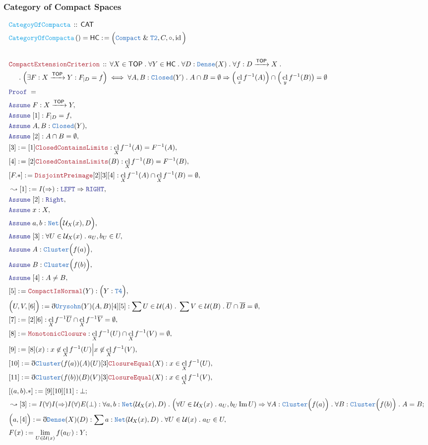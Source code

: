\documentclass[12pt]{scrartcl}
\newcommand{\TYPE}[1]{\textcolor{NavyBlue}{\mathtt{#1}}}
\newcommand{\FUNC}[1]{\textcolor{Cerulean}{\mathtt{#1}}}
\newcommand{\LOGIC}[1]{\textcolor{Blue}{\mathtt{#1}}}
\newcommand{\THM}[1]{\textcolor{Maroon}{\mathtt{#1}}}
\renewcommand{\.}{\; . \;}
\newcommand{\de}{: \kern 0.1pc =}
\newcommand{\Act}[1]{\left( #1 \right)}
\newcommand{\Theorem}[2]{& \THM{#1} \, :: \, #2 \\ & \Proof = \\ }
\newcommand{\DeclareFunc}[2]{& \FUNC{#1} \, :: \, #2 \\}
\newcommand{\DefineNamedFunc}[4]{&  \FUNC{#1}\Act{#2} = #3 \de #4 \\}
\newcommand{\NewLine}{\\ & \kern 1pc}
\newcommand{\Page}[1]{ \begin{align*} #1 \end{align*}   }
\newcommand{ \bd }{ \ByDef }
\renewcommand{\And}{\; \& \;}
\newcommand{\Imply}{\Rightarrow}
\DeclareMathOperator*{\id}{id}
\DeclareMathOperator*{\im}{Im}
\newcommand{\Arrow}{\xrightarrow}
\newcommand{\Say}[3]{& #1 \de #2 : #3, \\}
\newcommand{\Conclude}[3]{& #1 \de #2 : #3; \\}
\newcommand{\Derive}[3]{& \leadsto #1 \de #2 : #3, \\}
\newcommand{\DeriveConclude}[3]{& \leadsto #1 \de #2 : #3 ; \\}
\newcommand{\Assume}[2]{& \LOGIC{Assume} \; #1 : #2, \\}
\newcommand{\ByDef}{\eth}
\newcommand{\Proof}{\LOGIC{Proof} \; }
\newcommand{\CAT}{\mathsf{CAT}}
\DeclareMathOperator*{\cl}{cl}
\newcommand{\TOP}{\mathsf{TOP}}
\newcommand{\HC}{\mathsf{HC}}
\newcommand{\U}{\mathcal{U}}
\begin{document}
\subsubsection{Category of Compact Spaces}
\Page{
	\DeclareFunc{CategoyOfCompacta}{\CAT}
	\DefineNamedFunc{CategoryOfCompacta}{}{\HC}{ \Big( \TYPE{Compact} \And \TYPE{T2}, C, \circ, \id \Big)  } 
	\\
	\Theorem{CompactExtensionCriterion}
	{
		\forall X \in \TOP \.
		\forall Y \in \HC \. 
		\forall D : \TYPE{Dense}(X) \.
		\forall f : D \Arrow{\TOP} X \.
		\NewLine \. 
		\Big(\exists F : X \Arrow{\TOP} Y  : F_{|D} = f \Big)    
		\iff
		\forall A,B : \TYPE{Closed}(Y) \.  
		A \cap B= \emptyset \Imply
		\Big(\cl_x f^{-1}(A)\Big) \cap \Big( \cl_y f^{-1}(B) \big) = \emptyset 
	}
	\Assume{F}{X \Arrow{\TOP} Y}
	\Assume{[1]}{F_{|D} = f }
	\Assume{A,B}{\TYPE{Closed}(Y)}
	\Assume{[2]}{A \cap B = \emptyset}
	\Say{[3]}{[1]\THM{ClosedContainsLimits}}{\cl_X f^{-1}(A) = F^{-1}(A) }
	\Say{[4]}{[2]\THM{ClosedContainsLimits}(B)}{\cl_X f^{-1}(B) = F^{-1}(B)}
	\Say{[F.*]}{\THM{DisjointPreimage}[2][3][4]}{ \cl_X f^{-1}(A) \cap \cl_X f^{-1}(B) = \emptyset }
	\Derive{[1]}{I(\Imply)}{\LOGIC{LEFT} \Imply \LOGIC{RIGHT}}
	\Assume{[2]}{\LOGIC{Right}}
	\Assume{x}{X}
	\Assume{a,b}{\TYPE{Net}\Big(\U_X(x),D\Big)}
	\Assume{[3]}{\forall  U \in \U_X(x) \.  a_U,b_U \in U}
	\Assume{A}{\TYPE{Cluster}\Big(f(a)\Big)}
	\Assume{B}{\TYPE{Cluster}\Big( f(b)\Big)}
	\Assume{[4]}{A \neq B}
	\Say{[5]}{\THM{CompactIsNormal}(Y)}{\Big( Y : \TYPE{T4}\Big)}
	\Say{\Big( U,V, [6] \Big)}
	{
		\bd \TYPE{Urysohn}(Y)(A,B)[4][5] 
	}
	{
		\sum U \in \U(A) \. \sum V \in \U(B) \. 
		\overline{U} \cap \overline{B} = \emptyset 
	}
	\Say{[7]}{[2][6]}{\cl_X f^{-1}\overline{U} \cap \cl_X f^{-1}\overline{V} = \emptyset}
	\Say{[8]}{\THM{MonotonicClosure}}{\cl_X f^{-1}(U) \cap \cl_X f^{-1}(V) = \emptyset}
	\Say{[9]}{[8](x)}{x \not \in \cl_X f^{-1}(U) \Big| x \not \in \cl_X f^{-1}(V) }
	\Say{[10]}{\bd \TYPE{Cluster}(f(a))(A)(U)[3]\THM{ClosureEqual}(X)}{x \in \cl_X f^{-1}(U)}
	\Say{[11]}{\bd \TYPE{Cluster}(f(b))(B)(V)[3]\THM{ClosureEqual}(X)}{x \in \cl_X f^{-1}(V)}
	\Conclude{[(a,b).*]}{[9][10][11]}{\bot}
	\DeriveConclude{[3]}{I(\forall)I(\Imply)I(\forall)E(\bot)}
	{
		\forall a,b : \TYPE{Net}(\U_X(x),D) \.
		\Big( \forall U \in \U_X(x) \. a_U,b_U \im U) \Imply 
		\forall A : \TYPE{Cluster}\Big( f(a)\Big) \.
		\forall B : \TYPE{Cluster}\Big( f(b) \Big) \.
		A = B
	}
	\Say{\Big(a,[4]\Big)}{  \bd \TYPE{Dense}(X)(D)}{ \sum a : \TYPE{Net}(\U_X(x),D) \. \forall U \in \U(x) \. a_U \in U   }
	\Conclude{F(x)}{\lim_{U \in \U(x)} f(a_U)}{Y}
}
\end{document}
